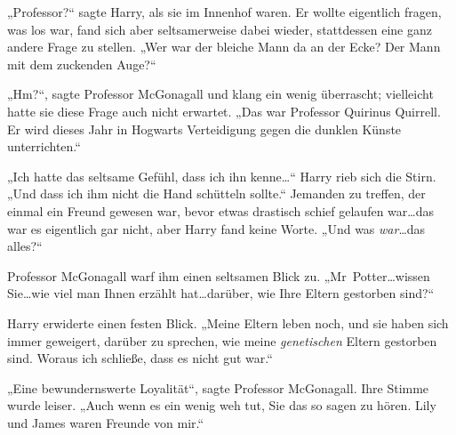 „Professor?“ sagte Harry, als sie im Innenhof waren. Er wollte eigentlich fragen, was los war, fand sich aber seltsamerweise dabei wieder, stattdessen eine ganz andere Frage zu stellen. „Wer war der bleiche Mann da an der Ecke? Der Mann mit dem zuckenden Auge?“

„Hm?“, sagte Professor McGonagall und klang ein wenig überrascht; vielleicht hatte sie diese Frage auch nicht erwartet. „Das war Professor Quirinus Quirrell. Er wird dieses Jahr in Hogwarts Verteidigung gegen die dunklen Künste unterrichten.“

„Ich hatte das seltsame Gefühl, dass ich ihn kenne…“ Harry rieb sich die Stirn. „Und dass ich ihm nicht die Hand schütteln sollte.“ Jemanden zu treffen, der einmal ein Freund gewesen war, bevor etwas drastisch schief gelaufen war…das war es eigentlich gar nicht, aber Harry fand keine Worte. „Und was \emph{war}…das alles?“

Professor McGonagall warf ihm einen seltsamen Blick zu. „Mr~Potter…wissen Sie…wie viel man Ihnen erzählt hat…darüber, wie Ihre Eltern gestorben sind?“

Harry erwiderte einen festen Blick. „Meine Eltern leben noch, und sie haben sich immer geweigert, darüber zu sprechen, wie meine \emph{genetischen} Eltern gestorben sind. Woraus ich schließe, dass es nicht gut war.“

„Eine bewundernswerte Loyalität“, sagte Professor McGonagall. Ihre Stimme wurde leiser. „Auch wenn es ein wenig weh tut, Sie das so sagen zu hören. Lily und James waren Freunde von mir.“

